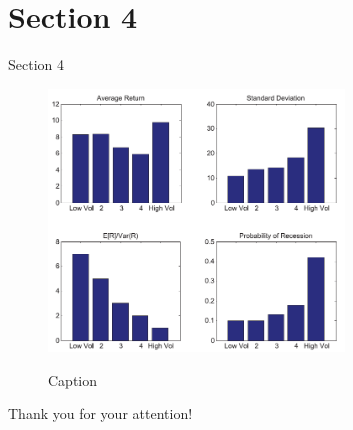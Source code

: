 \documentclass[9pt]{beamer}
\begin{document}
\section{Section 4}
\begin{frame}{Section 4}
   \begin{figure}[h]
			\centering
			\includegraphics[width = 0.7\textwidth]{img/MM.PNG}
            \label{fig:MManalysis}
            \caption{Caption}
	\end{figure}

\end{frame}

    \begin{frame}{\phantom{sdf}}
    \begin{center}
        \Huge Thank you for your attention!
    \end{center}
        
    \end{frame}
\end{document}
